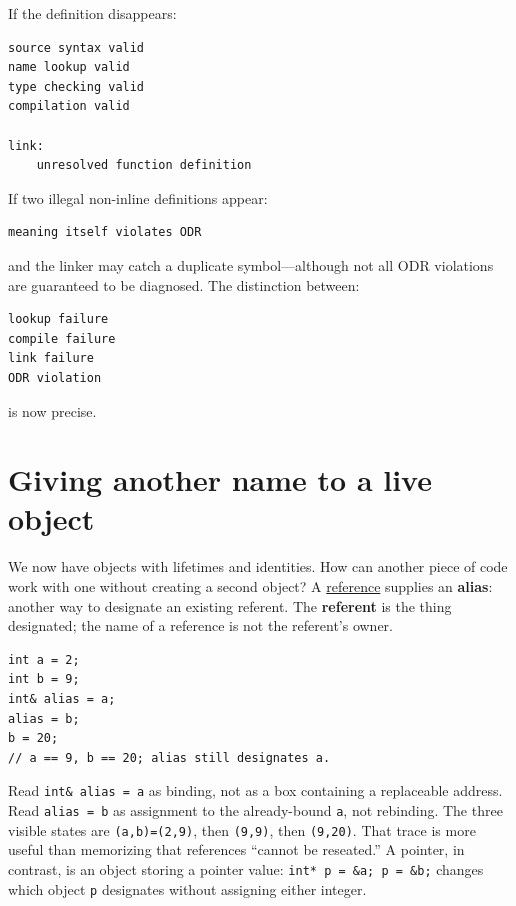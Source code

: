 If the definition disappears:

\begin{verbatim}
source syntax valid
name lookup valid
type checking valid
compilation valid

link:
    unresolved function definition
\end{verbatim}

If two illegal non-inline definitions appear:

\begin{verbatim}
meaning itself violates ODR
\end{verbatim}

and the linker may catch a duplicate symbol---although not all ODR violations are guaranteed to be diagnosed. The distinction between:

\begin{verbatim}
lookup failure
compile failure
link failure
ODR violation
\end{verbatim}

is now precise.

\section{Giving another name to a live object}\label{05-engine-i-ch003-giving-another-name-to-a-live-object}

We now have objects with lifetimes and identities. How can another piece of code work with one without creating a second object? A \hyperref[appendix-d6d562ca9fbb]{reference} supplies an \textbf{alias}: another way to designate an existing referent. The \textbf{referent} is the thing designated; the name of a reference is not the referent's owner.

\begin{verbatim}
int a = 2;
int b = 9;
int& alias = a;
alias = b;
b = 20;
// a == 9, b == 20; alias still designates a.
\end{verbatim}

Read \texttt{int\&\ alias\ =\ a} as binding, not as a box containing a replaceable address. Read \texttt{alias\ =\ b} as assignment to the already-bound \texttt{a}, not rebinding. The three visible states are \texttt{(a,b)=(2,9)}, then \texttt{(9,9)}, then \texttt{(9,20)}. That trace is more useful than memorizing that references ``cannot be reseated.'' A pointer, in contrast, is an object storing a pointer value: \texttt{int*\ p\ =\ \&a;\ p\ =\ \&b;} changes which object \texttt{p} designates without assigning either integer.

